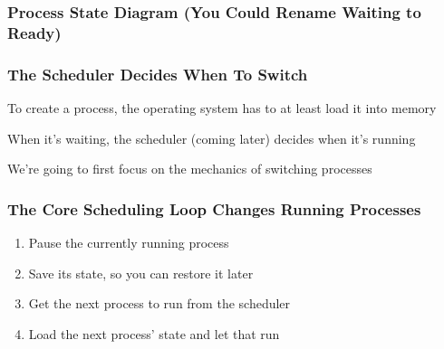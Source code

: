   \begin{frame}
    \frametitle{Process State Diagram (You Could Rename Waiting to Ready)}

  \end{frame}

  \begin{frame}
    \frametitle{The Scheduler Decides When To Switch}

    To create a process, the operating system has to at least load it into memory

    \hspace{2em}

    When it's waiting, the scheduler (coming later) decides when it's running

    \hspace{2em}

    We're going to first focus on the mechanics of switching processes
  \end{frame}

  \begin{frame}
    \frametitle{The Core Scheduling Loop Changes Running Processes}

    \begin{enumerate}
      \item Pause the currently running process 
      \item Save its state, so you can restore it later
      \item Get the next process to run from the scheduler
      \item Load the next process' state and let that run
    \end{enumerate}
  \end{frame}

